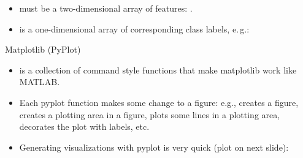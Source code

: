 \begin{frame}
	
\end{frame}


\begin{frame}
	\begin{itemize}
		\item {} must be a two-dimensional array of features: .
		\item {} is a one-dimensional array of corresponding class labels, e.\,g.: 
	\end{itemize}
	
\end{frame}


\begin{dwHeaderFrame}{Matplotlib (PyPlot)}
	\begin{itemize}
		\item {} is a collection of command style functions that make matplotlib work like MATLAB.
		\item Each pyplot function makes some change to a figure: e.g., creates a figure, creates a plotting area in a figure,
			plots some lines in a plotting area, decorates the plot with labels, etc.
		\item Generating visualizations with pyplot is very quick (plot on next slide):
	\end{itemize}
	
\end{dwHeaderFrame}


\begin{frame}
\end{frame}


